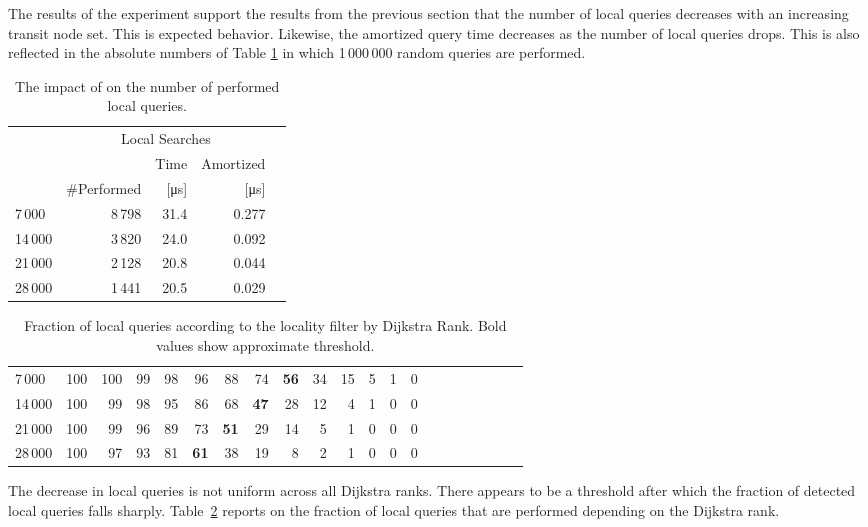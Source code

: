 \documentclass{llncs}
\begin{document}
The results of the experiment support the results from the previous section that the number of local queries decreases with an increasing transit node set.
This is expected behavior.
Likewise, the amortized query time decreases as the number of local queries drops.
This is also reflected in the absolute numbers of Table \ref{tab:LocalQueries} in which 1\,000\,000 random queries are performed.
\begin{table}[b]
\caption{The impact of  on the number of performed local queries.}
\label{tab:LocalQueries}
\centering
\begin{tabular}{lrrrr}
\toprule
				& \multicolumn{3}{c}{Local Searches} \\
\cmidrule{2-4}
	&				& Time					& Amortized \\					
	& \#Performed 	& [\si{\micro\second}] 	& [\si{\micro\second}] \\ 	
\midrule
7\,000 & 8\,798 & 31.4 & 0.277 \\
14\,000 & 3\,820 & 24.0 & 0.092 \\
21\,000 & 2\,128 & 20.8 & 0.044 \\
28\,000 & 1\,441 & 20.5 & 0.029 \\
\bottomrule 
\end{tabular}
\end{table}

\begin{table}[h]
\caption{Fraction of local queries according to the locality filter by Dijkstra Rank. Bold values show approximate  threshold.}
\label{tab:filterByRank}
\centering
\begin{tabular}{lrrrrrrrrrrrrrrrrrrrr}
\toprule 
 &  &  &  &  &  &  &  &  &  &  &  &  &  \\ 
\midrule
7\,000 & 100 & 100 & 99 & 98 & 96 & 88 & 74 & \textbf{56} & 34 & 15 & 5 & 1 & 0 \\
14\,000 & 100 & 99 & 98 & 95 & 86 & 68 & \textbf{47} & 28 & 12 & 4 & 1 & 0 & 0 \\
21\,000 & 100 & 99 & 96 & 89 & 73 & \textbf{51} & 29 & 14 & 5 & 1 & 0 & 0 & 0 \\
28\,000 & 100 & 97 & 93 & 81 & \textbf{61} & 38 & 19 & 8 & 2 & 1 & 0 & 0 & 0 \\
\bottomrule 
\end{tabular}
\end{table}

The decrease in local queries is not uniform across all Dijkstra ranks.
There appears to be a threshold after which the fraction of detected local queries falls sharply.
Table~\ref{tab:filterByRank} reports on the fraction of local queries that are performed depending on the Dijkstra rank.
\end{document}
